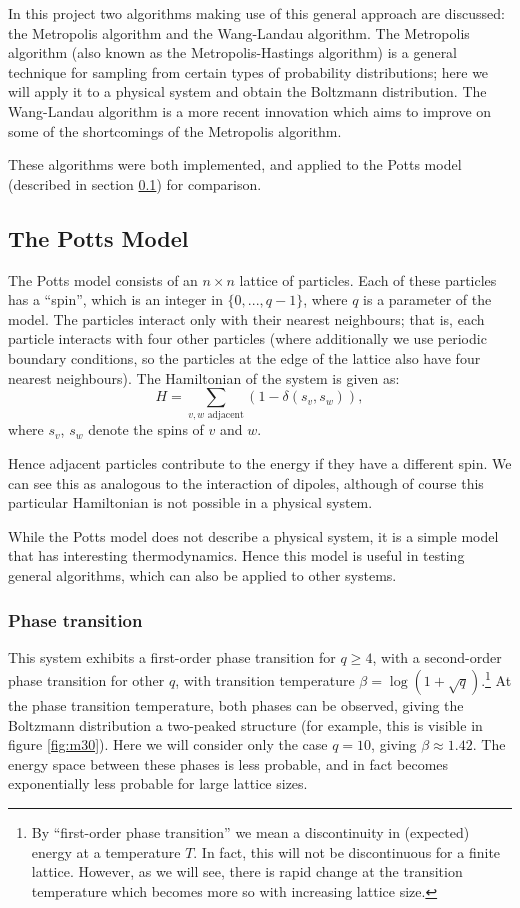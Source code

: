 \documentclass{article}
\begin{document}
In this project two algorithms making use of this general approach are discussed: the Metropolis algorithm and the Wang-Landau algorithm.
The Metropolis algorithm (also known as the Metropolis-Hastings algorithm) is a general technique for sampling from certain types of probability distributions; here we will apply it to a physical system and obtain the Boltzmann distribution.
The Wang-Landau algorithm is a more recent innovation which aims to improve on some of the shortcomings of the Metropolis algorithm.

These algorithms were both implemented, and applied to the Potts model (described in section \ref{sec:potts_model}) for comparison.

\subsection{The Potts Model}
\label{sec:potts_model}
The Potts model consists of an $n\times n$ lattice of particles.
Each of these particles has a ``spin'', which is an integer in $\{0,...,q-1\}$, where $q$ is a parameter of the model.
The particles interact only with their nearest neighbours; that is, each particle interacts with four other particles (where additionally we use periodic boundary conditions, so the particles at the edge of the lattice also have four nearest neighbours).
The Hamiltonian of the system is given as:
$$ H = \sum_{v, w \text{ adjacent}}(1-\delta(s_v, s_w)), $$
where $s_v$, $s_w$ denote the spins of $v$ and $w$.

Hence adjacent particles contribute to the energy if they have a different spin.
We can see this as analogous to the interaction of dipoles, although of course this particular Hamiltonian is not possible in a physical system.

While the Potts model does not describe a physical system, it is a simple model that has interesting thermodynamics.
Hence this model is useful in testing general algorithms, which can also be applied to other systems.

\subsubsection{Phase transition}
This system exhibits a first-order phase transition for $q \geq 4$, with a second-order phase transition for other $q$, with transition temperature $\beta = \log(1 + \sqrt q)$.\cite{Janke}\footnote{By ``first-order phase transition'' we mean a discontinuity in (expected) energy at a temperature $T$. In fact, this will not be discontinuous for a finite lattice. However, as we will see, there is rapid change at the transition temperature which becomes more so with increasing lattice size.}
At the phase transition temperature, both phases can be observed, giving the Boltzmann distribution a two-peaked structure (for example, this is visible in figure \ref{fig:m30}).
Here we will consider only the case $q = 10$, giving $\beta \approx 1.42$.
The energy space between these phases is less probable, and in fact becomes exponentially less probable for large lattice sizes.\cite{WangLandau}
\end{document}
